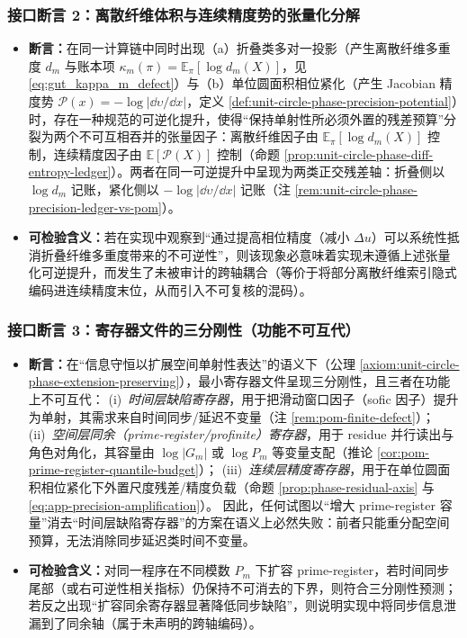 \subsubsection{接口断言 2：离散纤维体积与连续精度势的张量化分解}\label{app:bridgepack-assertion-2}
\begin{itemize}
  \item \textbf{断言：}在同一计算链中同时出现（a）折叠类多对一投影（产生离散纤维多重度 \(d_m\) 与账本项 \(\kappa_m(\pi)=\mathbb{E}_\pi[\log d_m(X)]\)，见 \eqref{eq:gut_kappa_m_defect}）与（b）单位圆面积相位紧化（产生 Jacobian 精度势 \(\mathcal{P}(x)=-\log|\dd\upsilon/\dd x|\)，定义 \ref{def:unit-circle-phase-precision-potential}）时，存在一种规范的可逆化提升，使得“保持单射性所必须外置的残差预算”分裂为两个不可互相吞并的张量因子：离散纤维因子由 \(\mathbb{E}_\pi[\log d_m(X)]\) 控制，连续精度因子由 \(\mathbb{E}[\mathcal{P}(X)]\) 控制（命题 \ref{prop:unit-circle-phase-diff-entropy-ledger}）。两者在同一可逆提升中呈现为两类正交残差轴：折叠侧以 \(\log d_m\) 记账，紧化侧以 \(-\log|\dd\upsilon/\dd x|\) 记账（注 \ref{rem:unit-circle-phase-precision-ledger-vs-pom}）。
  \item \textbf{可检验含义：}若在实现中观察到“通过提高相位精度（减小 \(\Delta u\)）可以系统性抵消折叠纤维多重度带来的不可逆性”，则该现象必意味着实现未遵循上述张量化可逆提升，而发生了未被审计的跨轴耦合（等价于将部分离散纤维索引隐式编码进连续精度末位，从而引入不可复核的混码）。
\end{itemize}

\subsubsection{接口断言 3：寄存器文件的三分刚性（功能不可互代）}\label{app:bridgepack-assertion-3}
\begin{itemize}
  \item \textbf{断言：}在“信息守恒以扩展空间单射性表达”的语义下（公理 \ref{axiom:unit-circle-phase-extension-preserving}），最小寄存器文件呈现三分刚性，且三者在功能上不可互代：
  (i)~\emph{时间层缺陷寄存器}，用于把滑动窗口因子（sofic 因子）提升为单射，其需求来自时间同步/延迟不变量（注 \ref{rem:pom-finite-defect}）；
  (ii)~\emph{空间层同余（prime-register/profinite）寄存器}，用于 residue 并行读出与角色对角化，其容量由 \(\log|G_m|\) 或 \(\log P_m\) 等变量支配（推论 \ref{cor:pom-prime-register-quantile-budget}）；
  (iii)~\emph{连续层精度寄存器}，用于在单位圆面积相位紧化下外置尺度残差/精度负载（命题 \ref{prop:phase-residual-axis} 与 \eqref{eq:app-precision-amplification}）。
  因此，任何试图以“增大 prime-register 容量”消去“时间层缺陷寄存器”的方案在语义上必然失败：前者只能重分配空间预算，无法消除同步延迟类时间不变量。
  \item \textbf{可检验含义：}对同一程序在不同模数 \(P_m\) 下扩容 prime-register，若时间同步尾部（或右可逆性相关指标）仍保持不可消去的下界，则符合三分刚性预测；若反之出现“扩容同余寄存器显著降低同步缺陷”，则说明实现中将同步信息泄漏到了同余轴（属于未声明的跨轴编码）。
\end{itemize}

